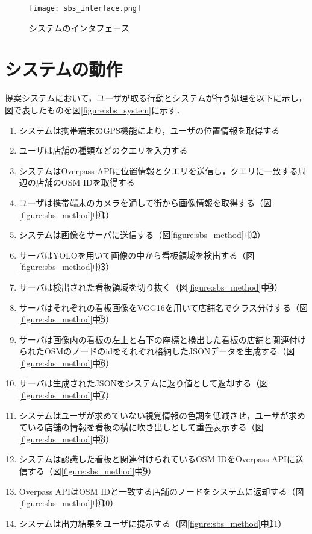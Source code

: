 \begin{figure}[tb]
  \centerline{\texttt{[image: sbs\_interface.png]}}
  \caption{システムのインタフェース}
  \label{figure:sbs_interface}
\end{figure}

\section{システムの動作}
  提案システムにおいて，ユーザが取る行動とシステムが行う処理を以下に示し，図で表したものを図\ref{figure:sbs_system}に示す．
  \begin{enumerate}
    \item システムは携帯端末のGPS機能により，ユーザの位置情報を取得する
    \item ユーザは店舗の種類などのクエリを入力する
    \item システムはOverpass APIに位置情報とクエリを送信し，クエリに一致する周辺の店舗のOSM IDを取得する
    \item ユーザは携帯端末のカメラを通して街から画像情報を取得する（図\ref{figure:sbs_method}中\textcircled{\scriptsize 1}）
    \item システムは画像をサーバに送信する（図\ref{figure:sbs_method}中\textcircled{\scriptsize 2}）
    \item サーバはYOLOを用いて画像の中から看板領域を検出する（図\ref{figure:sbs_method}中\textcircled{\scriptsize 3}）
    \item サーバは検出された看板領域を切り抜く（図\ref{figure:sbs_method}中\textcircled{\scriptsize 4}）
    \item サーバはそれぞれの看板画像をVGG16を用いて店舗名でクラス分けする（図\ref{figure:sbs_method}中\textcircled{\scriptsize 5}）
    \item サーバは画像内の看板の左上と右下の座標と検出した看板の店舗と関連付けられたOSMのノードのidをそれぞれ格納したJSONデータを生成する（図\ref{figure:sbs_method}中\textcircled{\scriptsize 6}）
    \item サーバは生成されたJSONをシステムに返り値として返却する（図\ref{figure:sbs_method}中\textcircled{\scriptsize 7}）
    \item システムはユーザが求めていない視覚情報の色調を低減させ，ユーザが求めている店舗の情報を看板の横に吹き出しとして重畳表示する（図\ref{figure:sbs_method}中\textcircled{\scriptsize 8}）
    \item システムは認識した看板と関連付けられているOSM IDをOverpass APIに送信する（図\ref{figure:sbs_method}中\textcircled{\scriptsize 9}）
    \item Overpass APIはOSM IDと一致する店舗のノードをシステムに返却する（図\ref{figure:sbs_method}中\textcircled{\scriptsize 10}）
    \item システムは出力結果をユーザに提示する（図\ref{figure:sbs_method}中\textcircled{\scriptsize 11}）
  \end{enumerate}

